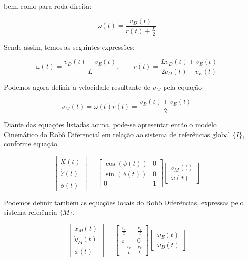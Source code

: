 bem, como para roda direita:

\begin{equation}
    \omega(t) = \frac{v_{D}(t)}{r(t) + \frac{L}{2}}
\end{equation}

Sendo assim, temos as seguintes expressões:

\begin{equation}
    \omega(t) = \frac{v_{D}(t) - v_{E}(t)}{L}, \quad\quad r(t) = \frac{Lv_{D}(t) + v_{E}(t)}{2v_{D}(t) - v_{E}(t)}
\end{equation}

Podemos agora definir a velocidade resultante de $v_M$ pela equação

\begin{equation}
    v_M (t) = \omega(t) r(t) = \frac{v_{D}(t) + v_{E}(t)}{2}
\end{equation}

Diante das equações listadas acima, pode-se apresentar então o modelo Cinemático do Robô Diferencial em relação ao sistema de referências global $\{I\}$, conforme equação

\begin{equation}
    \begin{bmatrix}
        \dot{X}(t) \\ \dot{Y}(t) \\ \dot{\phi}(t)
    \end{bmatrix}
    =
    \begin{bmatrix}
        \cos(\phi(t)) & 0 \\
        \sin(\phi(t)) & 0 \\
        0             & 1
    \end{bmatrix}
    \begin{bmatrix}
        v_M(t) \\ \omega(t)
    \end{bmatrix}
\end{equation}

Podemos definir também as equações locais do Robô Diferências, expressas pelo sistema referência $\{M\}$.

\begin{equation}
    \begin{bmatrix}
        \dot{x}_M(t) \\ \dot{y}_M(t) \\ \dot{\phi}(t)
    \end{bmatrix}
    =
    \begin{bmatrix}
        \frac{r_r}{2} & \frac{r_r}{2} \\
        o & 0 \\
        -\frac{r_r}{L} & \frac{r_r}{L}
    \end{bmatrix}
    \begin{bmatrix}
        \omega_E(t) \\ \omega_D(t)
    \end{bmatrix}
\end{equation}



